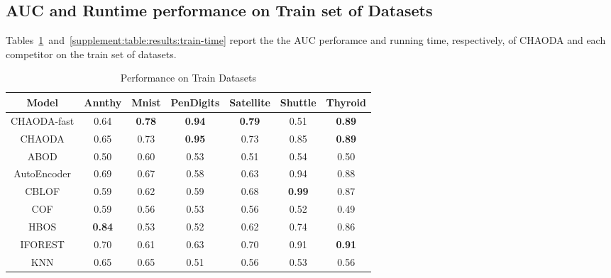 \documentclass{article}
\begin{document}
\subsection{AUC and Runtime performance on Train set of Datasets}

Tables~\ref{supplement:table:results:train-performance}~and~\ref{supplement:table:results:train-time} report the  the AUC perforamce and running time, respectively, of CHAODA and each competitor on the train set of datasets.

\begin{table}[!t]
\renewcommand{\arraystretch}{1.25}
\caption{Performance on Train Datasets}
\label{supplement:table:results:train-performance}
\vskip 0.15in
\begin{center}
\begin{small}
\begin{tabular}{|c|c|c|c|c|c|c|}
\hline
\textbf{Model} & \textbf{Annthy} & \textbf{Mnist} & \textbf{PenDigits} & \textbf{Satellite} & \textbf{Shuttle} & \textbf{Thyroid} \\
\hline
CHAODA-fast &                0.64 &  \textbf{0.78} &      \textbf{0.94} &      \textbf{0.79} &             0.51 &    \textbf{0.89} \\
\hline
CHAODA &                0.65 &           0.73 &      \textbf{0.95} &               0.73 &             0.85 &    \textbf{0.89} \\
\hline
ABOD &                0.50 &           0.60 &               0.53 &               0.51 &             0.54 &             0.50 \\
\hline
AutoEncoder &                0.69 &           0.67 &               0.58 &               0.63 &             0.94 &             0.88 \\
\hline
CBLOF &                0.59 &           0.62 &               0.59 &               0.68 &    \textbf{0.99} &             0.87 \\
\hline
COF &                0.59 &           0.56 &               0.53 &               0.56 &             0.52 &             0.49 \\
\hline
HBOS &       \textbf{0.84} &           0.53 &               0.52 &               0.62 &             0.74 &             0.86 \\
\hline
IFOREST &                0.70 &           0.61 &               0.63 &               0.70 &             0.91 &    \textbf{0.91} \\
\hline
KNN &                0.65 &           0.65 &               0.51 &               0.56 &             0.53 &             0.56 \\

\end{tabular}
\end{small}
\end{center}
\end{table}
\end{document}
